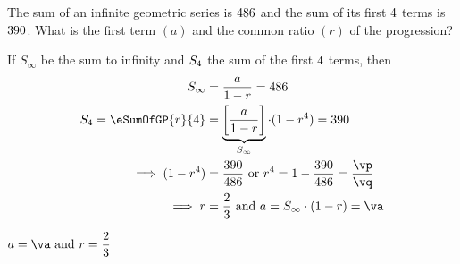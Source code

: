 

\vf\vs\vp\vq
{}\vj\vk\vx\vy
\FRACMULT\vx\vy{}\va\vb

\question[2] The sum of an infinite geometric series is $486$ and the sum of
its first $4$ terms is $390$. What is the first term $(a)$ and the 
common ratio $(r)$ of the progression?

\watchout

\begin{solution}[\halfpage]
  If $S_\infty$ be the sum to infinity and $S_4$ the sum of the first $4$ terms, then 
	\begin{align}
		S_\infty &= \dfrac{a}{1-r} = \vs \\
		S_\vn = \eSumOfGP{r}{\vn} &= \underbrace{\left[ \dfrac{a}{1-r}\right]}_{S_\infty}\cdot (1-r^\vn) = \vf \\
    \implies (1-r^\vn) &= \dfrac\vf\vs\text{ or } r^\vn = 1-\dfrac\vf\vs = \dfrac\vp\vq \\
    \implies r &= \dfrac\vj\vk\text{ and } a = S_\infty\cdot (1-r) = \va
	\end{align}
\end{solution}
\ifprintanswers\begin{codex}$a=\va\text{ and }r = \dfrac\vj\vk$\end{codex}\fi
